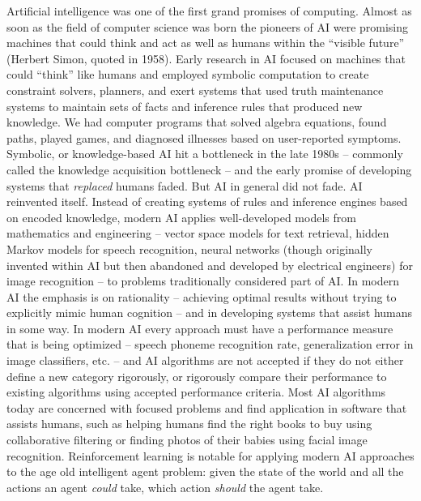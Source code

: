 Artificial intelligence was one of the first grand promises of computing. Almost as soon as the field of computer science was born the pioneers of AI were promising machines that could think and act as well as humans within the ``visible future'' (Herbert Simon, quoted in 1958). Early research in AI focused on machines that could ``think'' like humans and employed symbolic computation to create constraint solvers, planners, and exert systems that used truth maintenance systems to maintain sets of facts and inference rules that produced new knowledge. We had computer programs that solved algebra equations, found paths, played games, and diagnosed illnesses based on user-reported symptoms. Symbolic, or knowledge-based AI hit a bottleneck in the late 1980s -- commonly called the knowledge acquisition bottleneck -- and the early promise of developing systems that {\it replaced} humans faded. But AI in general did not fade. AI reinvented itself. Instead of creating systems of rules and inference engines based on encoded knowledge, modern AI applies well-developed models from mathematics and engineering -- vector space models for text retrieval, hidden Markov models for speech recognition, neural networks (though originally invented within AI but then abandoned and developed by electrical engineers) for image recognition -- to problems traditionally considered part of AI. In modern AI the emphasis is on rationality -- achieving optimal results without trying to explicitly mimic human cognition -- and in developing systems that assist humans in some way. In modern AI every approach must have a performance measure that is being optimized -- speech phoneme recognition rate, generalization error in image classifiers, etc. -- and AI algorithms are not accepted if they do not either define a new category rigorously, or rigorously compare their performance to existing algorithms using accepted performance criteria. Most AI algorithms today are concerned with focused problems and find application in software that assists humans, such as helping humans find the right books to buy using collaborative filtering or finding photos of their babies using facial image recognition.  Reinforcement learning is notable for applying modern AI approaches to the age old intelligent agent problem: given the state of the world and all the actions an agent {\it could} take, which action {\it should} the agent take.

